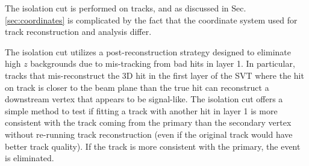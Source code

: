 The isolation cut is performed on tracks, and as discussed in Sec. \ref{sec:coordinates} is complicated by the fact that the coordinate system used for track reconstruction and analysis differ.%



The isolation cut utilizes a post-reconstruction strategy designed to eliminate high $z$ backgrounds due to mis-tracking from bad hits in layer 1. In particular, tracks that mis-reconstruct the 3D hit in the first layer of the SVT where the hit on track is closer to the beam plane than the true hit can reconstruct a downstream vertex that appears to be signal-like. The isolation cut offers a simple method to test if fitting a track with another hit in layer 1 is more consistent with the track coming from the primary than the secondary vertex without re-running track reconstruction (even if the original track would have better track quality). If the track is more consistent with the primary, the event is eliminated. 

